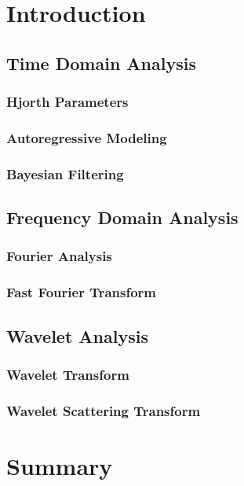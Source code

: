 \section*{Introduction}

\subsection{Time Domain Analysis}

\subsubsection{Hjorth Parameters}

\subsubsection{Autoregressive Modeling}

\subsubsection{Bayesian Filtering}

\subsection{Frequency Domain Analysis}

\subsubsection{Fourier Analysis}

\subsubsection{Fast Fourier Transform}

\subsection{Wavelet Analysis}

\subsubsection{Wavelet Transform}

\subsubsection{Wavelet Scattering Transform}

\section{Summary}